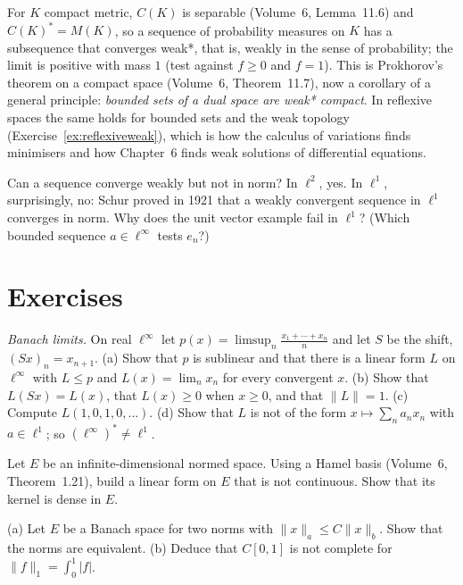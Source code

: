 For $K$ compact metric, $C(K)$ is separable (Volume~6, Lemma~11.6) and $C(K)^*=M(K)$, so a sequence of probability measures on $K$ has a subsequence that converges weak*, that is, weakly in the sense of probability; the limit
is positive with mass $1$ (test against $f\ge0$ and $f=1$). This is Prokhorov's theorem on a compact space (Volume~6, Theorem~11.7), now a corollary of a general principle: \emph{bounded sets of a dual space are weak* compact}.
In reflexive spaces the same holds for bounded sets and the weak topology (Exercise~\ref{ex:reflexiveweak}), which is how the calculus of variations finds minimisers and how Chapter~6 finds weak solutions of differential
equations.

\begin{think}
Can a sequence converge weakly but not in norm? In $\ell^2$, yes. In $\ell^1$, surprisingly, no: Schur proved in 1921 that a weakly convergent sequence in $\ell^1$ converges in norm. Why does the unit vector example fail in
$\ell^1$? (Which bounded sequence $a\in\ell^\infty$ tests $e_n$?)
\end{think}

\section{Exercises}

\begin{exercise}[$\star\star$]\label{ex:banachlimit}
\emph{Banach limits.} On real $\ell^\infty$ let $p(x)=\limsup_n\frac{x_1+\cdots+x_n}n$ and let $S$ be the shift, $(Sx)_n=x_{n+1}$. (a) Show that $p$ is sublinear and that there is a linear form $L$ on $\ell^\infty$ with $L\le p$ and
$L(x)=\lim_nx_n$ for every convergent $x$. (b) Show that $L(Sx)=L(x)$, that $L(x)\ge0$ when $x\ge0$, and that $\|L\|=1$. (c) Compute $L(1,0,1,0,\dots)$. (d) Show that $L$ is not of the form $x\mapsto\sum_na_nx_n$ with
$a\in\ell^1$; so $(\ell^\infty)^*\ne\ell^1$.
\end{exercise}

\begin{exercise}[$\star$]\label{ex:discontinuous}
Let $E$ be an infinite-dimensional normed space. Using a Hamel basis (Volume~6, Theorem~1.21), build a linear form on $E$ that is not continuous. Show that its kernel is dense in $E$.
\end{exercise}

\begin{exercise}[$\star$]\label{ex:twonorms}
(a) Let $E$ be a Banach space for two norms with $\|x\|_a\le C\|x\|_b$. Show that the norms are equivalent. (b) Deduce that $C[0,1]$ is not complete for $\|f\|_1=\int_0^1|f|$.
\end{exercise}

